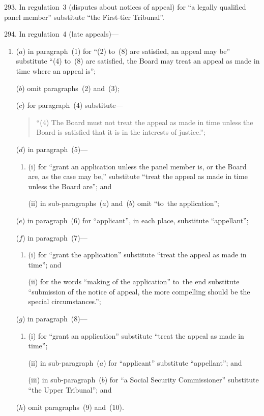 \documentclass[12pt,a4paper]{article}
\begin{document}
\medskip

293.  In regulation~3 (disputes about notices of appeal) for “a legally qualified panel member” substitute “the First-tier Tribunal”.

\medskip

294.  In regulation~4 (late appeals)—
\begin{enumerate}\item[]
($a$) in paragraph~(1) for “(2) to~(8) are satisfied, an appeal may be” substitute “(4) to~(8) are satisfied, the Board may treat an appeal as made in time where an appeal is”;

($b$) omit paragraphs~(2) and~(3);

($c$) for paragraph~(4) substitute—
\begin{quotation}
“(4) The Board must not treat the appeal as made in time unless the Board is satisfied that it is in the interests of justice.”;
\end{quotation}

($d$) in paragraph~(5)—
\begin{enumerate}\item[]
(i) for “grant an application unless the panel member is, or the Board are, as the case may be,” substitute “treat the appeal as made in time unless the Board are”; and

(ii) in sub-paragraphs~($a$)  and~($b$)  omit “to~the application”;
\end{enumerate}

($e$) in paragraph~(6) for “applicant”, in each place, substitute “appellant”;

($f$) in paragraph~(7)—
\begin{enumerate}\item[]
(i) for “grant the application” substitute “treat the appeal as made in time”; and

(ii) for the words “making of the application” to~the end substitute “submission of the notice of appeal, the more compelling should be the special circumstances.”;
\end{enumerate}

($g$) in paragraph~(8)—
\begin{enumerate}\item[]
(i) for “grant an application” substitute “treat the appeal as made in time”;

(ii) in sub-paragraph~($a$)  for “applicant” substitute “appellant”; and

(iii) in sub-paragraph~($b$)  for “a Social Security Commissioner” substitute “the Upper Tribunal”; and
\end{enumerate}

($h$) omit paragraphs~(9) and~(10).
\end{enumerate}
\end{document}
